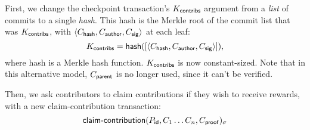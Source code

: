 First, we change the checkpoint transaction's $K_{\mathsf{contribs}}$ argument from a \emph{list}
of commits to a single \emph{hash}. This hash is the Merkle root of the commit list
that was $K_{\mathsf{contribs}}$, with $\langle C_{\mathsf{hash}}, C_{\mathsf{author}}, C_{\mathsf{sig}}\rangle$ at each leaf:
\[
    K_{\mathsf{contribs}} = \operatorname{\mathsf{hash}}(
        [\langle C_{\mathsf{hash}}, C_{\mathsf{author}}, C_{\mathsf{sig}}\rangle]
    ),
\]
where \textsf{hash} is a Merkle hash function. $K_{\mathsf{contribs}}$ is
now constant-sized. Note that in this alternative model, $C_{\mathsf{parent}}$ is
no longer used, since it can't be verified.

Then, we ask contributors to claim contributions if they wish to receive rewards, with
a new \textsf{claim-contribution} transaction:
\[
    \operatorname{\mathsf{claim-contribution}}\lparen P_{\mathsf{id}}, C_1 \dots C_n, C_{\mathsf{proof}}\rparen_\sigma
\]

